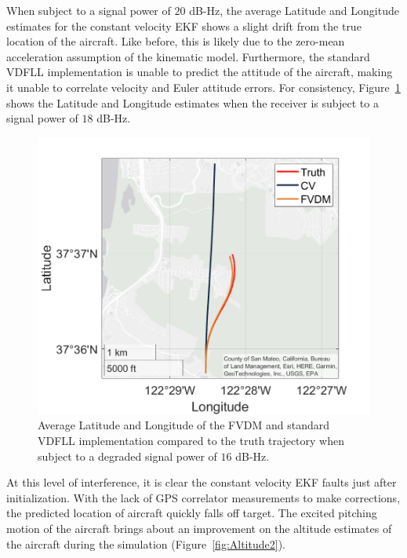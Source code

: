 When subject to a signal power of \(20\) dB-Hz, the average Latitude and Longitude estimates for the constant velocity EKF shows a slight drift from the true location of the aircraft. Like before, this is likely due to the zero-mean acceleration assumption of the kinematic model. Furthermore, the standard VDFLL implementation is unable to predict the attitude of the aircraft, making it unable to correlate velocity and Euler attitude errors. For consistency, Figure~\ref{fig:GEOPLOT4} shows the Latitude and Longitude estimates when the receiver is subject to a signal power of \(18\) dB-Hz.

\begin{figure}[!ht]
    \centering
    \includegraphics[width=0.5\linewidth]{Figures/dynamic/18/GEOPLOT.png}
    \caption{Average Latitude and Longitude of the FVDM and standard VDFLL implementation compared to the truth trajectory when subject to a degraded signal power of \(16\) dB-Hz.}\label{fig:GEOPLOT4}
\end{figure}

At this level of interference, it is clear the constant velocity EKF faults just after initialization. With the lack of GPS correlator measurements to make corrections, the predicted location of aircraft quickly falls off target. The excited pitching motion of the aircraft brings about an improvement on the altitude estimates of the aircraft during the simulation (Figure~\ref{fig:Altitude2}).

